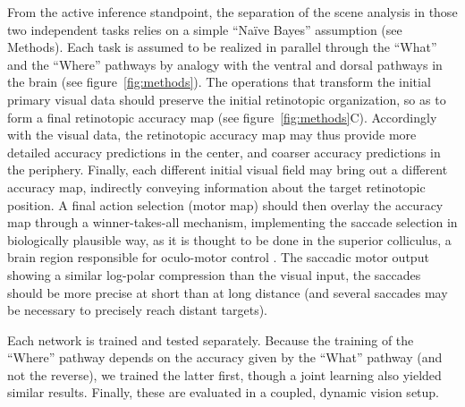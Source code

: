 From the active inference standpoint,  the separation of the scene analysis in those two independent tasks relies on a simple ``Naïve Bayes'' assumption   (see Methods). %
Each task is assumed to be realized in parallel through  the ``What'' and the ``Where'' pathways by analogy with the ventral and dorsal pathways in the brain (see figure~\ref{fig:methods}).
The operations that transform the initial primary visual data should preserve the initial retinotopic organization, so as to form a final retinotopic accuracy map (see figure~\ref{fig:methods}C). Accordingly with the visual data, the retinotopic accuracy map may thus provide more detailed accuracy predictions in the center, and coarser accuracy predictions in the periphery.
Finally, each different initial visual field may bring out a different accuracy map, indirectly conveying information about the target retinotopic position.
A final action selection (motor map) should then overlay the accuracy map through a winner-takes-all mechanism, implementing the saccade selection in biologically plausible way, as it is thought to be done in the superior colliculus, a brain region responsible for oculo-motor control \cite{sparks1987sensory}.
The saccadic motor output showing a similar log-polar compression than the visual input, the saccades should be more precise at short than at long distance (and several saccades may be necessary to precisely reach distant targets).

Each network is trained and tested separately. Because the training of the ``Where'' pathway depends on the accuracy given by the ``What'' pathway (and not the reverse), we trained the latter first, though a joint learning also yielded similar results. %
Finally, these are evaluated in a coupled, dynamic vision setup.



